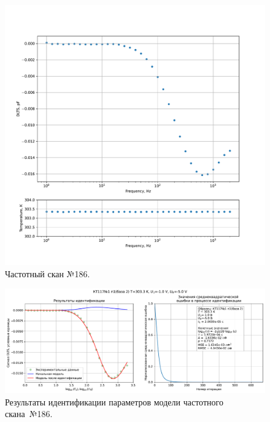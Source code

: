 \begin{figure}[!ht]
    \centering
    \includegraphics[width=1\textwidth]{../plots/КТ117№1_п1(база 2)_2500Гц-1Гц_1пФ_+30С_-1В-5В_200мВ_20мкс_шаг_0,1.pdf}
    \caption{Частотный скан №186.}
    \label{pic:frequency_scan_186}
\end{figure}

\begin{figure}[!ht]
    \centering
    \includegraphics[width=1\textwidth]{../plots/КТ117№1_п1(база 2)_2500Гц-1Гц_1пФ_+30С_-1В-5В_200мВ_20мкс_шаг_0,1_model.pdf}
    \caption{Результаты идентификации параметров модели частотного скана~№186.}
    \label{pic:frequency_scan_model186}
\end{figure}

\pagebreak


